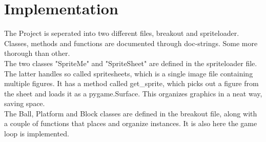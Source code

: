 \documentclass[12pt]{article}
\begin{document}
    \section{Implementation}
        The Project is seperated into two different files, breakout and spriteloader. 
        Classes, methods and functions are documented through doc-strings. Some more thorough than other. \\
        The two classes "SpriteMe" and "SpriteSheet" are defined in the spriteloader file. The latter handles so called spritesheets, which is a single image file containing multiple figures. It has a method called get\_sprite, which picks out a figure from the sheet and loads it as a pygame.Surface. This organizes graphics in a neat way, saving space.\\
        
        
        The Ball, Platform and Block classes are defined in the breakout file, along with a couple of functions that places and organize instances. It is also here the game loop is implemented. 
        
        
\end{document}

